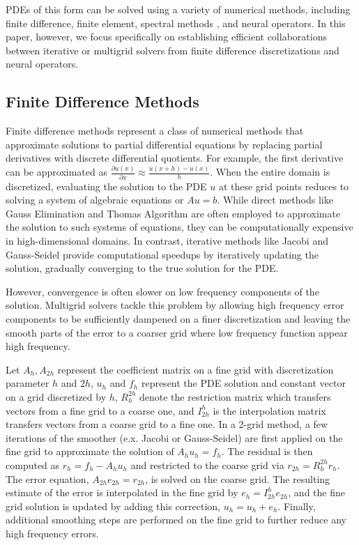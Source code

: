 \documentclass[12pt]{article}
\begin{document}
PDEs of this form can be solved using a variety of numerical methods, including finite difference, finite element, spectral methods \autocite{boyd2001chebyshev,canuto2006spectral}, and neural operators. In this paper, however, we focus specifically on establishing efficient collaborations between iterative or multigrid solvers from finite difference discretizations and neural operators.

\subsection{Finite Difference Methods} \label{sec:finitedifference}

Finite difference methods \autocite{smith1985numerical,leveque2007finite} represent a class of numerical methods that approximate solutions to partial differential equations by replacing partial derivatives with discrete differential quotients. For example, the first derivative can be approximated as $\frac{\partial u(x)}{\partial x} \approx \frac{u(x + h) - u(x)}{h}$. When the entire domain is discretized,  evaluating the solution to the PDE $u$ at these grid points reduces to solving a system of algebraic equations or $Au = b$. While direct methods like Gauss Elimination and Thomas Algorithm are often employed to approximate the solution to such systems of equations, they can be computationally expensive in high-dimensional domains. In contrast, iterative methods like Jacobi and Gauss-Seidel provide computational speedups by iteratively updating the solution, gradually converging to the true solution for the PDE. 

However, convergence is often slower on low frequency components of the solution. Multigrid solvers \autocite{briggs2000multigrid,trottenberg2001multigrid,hackbusch2013multi} tackle this problem by allowing high frequency error components to be sufficiently dampened on a finer discretization and leaving the smooth parts of the error to a coarser grid where low frequency function appear high frequency. 

Let $A_h, A_{2h}$ represent the coefficient matrix on a fine grid with discretization parameter $h$ and $2h$, $u_h$ and $f_h$ represent the PDE solution and constant vector on a grid discretized by $h$, $R^{2h}_h$ denote the restriction matrix which transfers vectors from a fine grid to a coarse one, and $I^{h}_{2h}$ is the interpolation matrix transfers vectors from a coarse grid to a fine one. In a 2-grid method, a few iterations of the smoother (e.x. Jacobi or Gauss-Seidel) are first applied on the fine grid to approximate the solution of $A_hu_h = f_h$. The residual is then computed as $r_h = f_h - A_hu_h$ and restricted to the coarse grid via $r_{2h} = R^{2h}_hr_h$. The error equation, $A_{2h}e_{2h} = r_{2h}$, is solved on the coarse grid. The resulting estimate of the error is interpolated in the fine grid by $e_h = I^{h}_{2h}e_{2h}$, and the fine grid solution is updated by adding this correction, $u_h = u_h + e_h$. Finally, additional smoothing steps are performed on the fine grid to further reduce any high frequency errors. 
\end{document}
